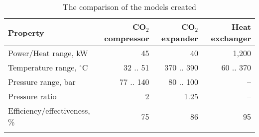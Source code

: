 \begin{table}
\label{tab:DiscussionComparison}
\caption{The comparison of the models created}
\begin{center}
\begin{tabulary}{0.9\textwidth}{LRRR}
\toprule
Property    	                &	CO$_2$ compressor   & CO$_2$	expander    & Heat exchanger    \\
\midrule
Power/Heat range, kW            &       45              &       40              &        1,200           \\
Temperature range, $^\circ$C    &    32 .. 51           &      370 .. 390       &   60 .. 370       \\
Pressure range, bar             &   77 .. 140           &     80 .. 100         &      --           \\
Pressure ratio                  &   2                   &        1.25           &      --           \\
Efficiency/effectiveness, \%    &      75               &         86            &       95          \\
& & & \\
\bottomrule
\end{tabulary}
\end{center}
\end{table}